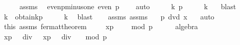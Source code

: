 \begin{isabellebody}
%
\isadelimproof
%
\endisadelimproof
%
\isatagproof
{}\isamarkupfalse%
\ {\isacharminus}{\kern0pt}\isanewline
\ \ \isamarkupfalse%
\ assms{\isacharparenleft}{\kern0pt}{}{\isacharparenright}{\kern0pt}\ \isamarkupfalse%
\ even{\isacharunderscore}{\kern0pt}p{\isacharunderscore}{\kern0pt}minus{\isacharunderscore}{\kern0pt}one{\isacharcolon}{\kern0pt}\ {\isachardoublequoteopen}even\ {\isacharparenleft}{\kern0pt}p\ {\isacharminus}{\kern0pt}\ {}{\isacharparenright}{\kern0pt}{\isachardoublequoteclose}\ \isamarkupfalse%
\ auto\isanewline
\ \ \isamarkupfalse%
\ \isamarkupfalse%
\ {\isachardoublequoteopen}{\isacharparenleft}{\kern0pt}{\isasymexists}k{\isachardot}{\kern0pt}\ p\ {\isacharminus}{\kern0pt}\ {}\ {\isacharequal}{\kern0pt}\ {}\ {\isacharasterisk}{\kern0pt}\ k{\isacharparenright}{\kern0pt}{\isachardoublequoteclose}\ \ \isamarkupfalse%
\ blast\isanewline
\ \ \isamarkupfalse%
\ \isamarkupfalse%
\ k\ \ obtain{\isacharunderscore}{\kern0pt}k{\isacharcolon}{\kern0pt}{\isachardoublequoteopen}p\ {\isacharminus}{\kern0pt}\ {}\ {\isacharequal}{\kern0pt}\ {}\ {\isacharasterisk}{\kern0pt}\ k{\isachardoublequoteclose}\ \isamarkupfalse%
\ blast\isanewline
\ \ \isamarkupfalse%
\ assms{\isacharparenleft}{\kern0pt}{}{\isacharparenright}{\kern0pt}\ assms{\isacharparenleft}{\kern0pt}{}{\isacharparenright}{\kern0pt}\ \isamarkupfalse%
\ {\isachardoublequoteopen}{\isasymnot}\ p\ dvd\ x{\isachardoublequoteclose}\ \ \isamarkupfalse%
\ auto\isanewline
\ \ \isamarkupfalse%
\ this\ assms{\isacharparenleft}{\kern0pt}{}{\isacharparenright}{\kern0pt}\ fermat{\isacharunderscore}{\kern0pt}theorem\ \isanewline
\ \ \isamarkupfalse%
\ {\isachardoublequoteopen}{\isacharbrackleft}{\kern0pt}x{\isacharcircum}{\kern0pt}{\isacharparenleft}{\kern0pt}p\ {\isacharminus}{\kern0pt}\ {}{\isacharparenright}{\kern0pt}\ {\isacharequal}{\kern0pt}\ {}{\isacharbrackright}{\kern0pt}\ {\isacharparenleft}{\kern0pt}mod\ p{\isacharparenright}{\kern0pt}{\isachardoublequoteclose}\isanewline
\ \ \ \ \isamarkupfalse%
\ algebra\isanewline
\ \ \isamarkupfalse%
\ \isamarkupfalse%
\ {\isachardoublequoteopen}{\isacharbrackleft}{\kern0pt}x{\isacharcircum}{\kern0pt}{\isacharparenleft}{\kern0pt}{\isacharparenleft}{\kern0pt}p\ {\isacharminus}{\kern0pt}\ {}{\isacharparenright}{\kern0pt}\ div\ {}{\isacharparenright}{\kern0pt}\ {\isacharasterisk}{\kern0pt}\ x{\isacharcircum}{\kern0pt}{\isacharparenleft}{\kern0pt}{\isacharparenleft}{\kern0pt}p\ {\isacharminus}{\kern0pt}\ {}{\isacharparenright}{\kern0pt}\ div\ {}{\isacharparenright}{\kern0pt}\ {\isacharequal}{\kern0pt}\ {}{\isacharbrackright}{\kern0pt}\ {\isacharparenleft}{\kern0pt}mod\ p{\isacharparenright}{\kern0pt}{\isachardoublequoteclose}\ \isanewline

\end{isabellebody}
